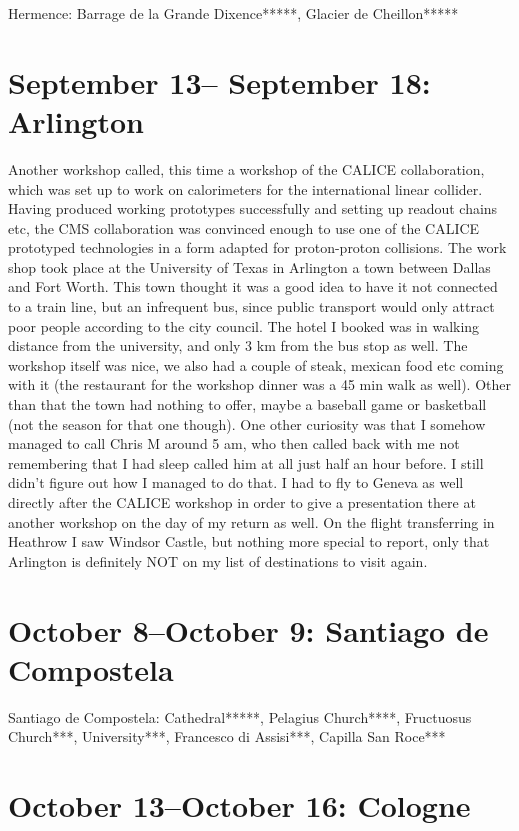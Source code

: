 Hermence: Barrage de la Grande Dixence*****, Glacier de Cheillon*****

\section{September 13-- September 18: Arlington}
\label{Arlington2016}

Another workshop called, this time a workshop of the CALICE collaboration, which was set up to work on calorimeters for the international linear collider. Having produced working prototypes successfully and setting up readout chains etc, the CMS collaboration was convinced enough to use one of the CALICE prototyped technologies in a form adapted for proton-proton collisions. The work shop took place at the University of Texas in Arlington a town between Dallas and Fort Worth. This town thought it was a good idea to have it not connected to a train line, but an infrequent bus, since public transport would only attract poor people according to the city council. The hotel I booked was in walking distance from the university, and only 3 km from the bus stop as well. The workshop itself was nice, we also had a couple of steak, mexican food etc coming with it (the restaurant for the workshop dinner was a 45 min walk as well). Other than that the town had nothing to offer, maybe a baseball game or basketball (not the season for that one though). One other curiosity was that I somehow managed to call Chris M around 5 am, who then called back with me not remembering that I had sleep called him at all just half an hour before. I still didn't figure out how I managed to do that. I had to fly to Geneva as well directly after the CALICE workshop in order to give a presentation there at another workshop on the day of my return as well. On the flight transferring in Heathrow I saw Windsor Castle, but nothing more special to report, only that Arlington is definitely NOT on my list of destinations to visit again.

\section{October 8--October 9: Santiago de Compostela}
\label{Santiago2016}

Santiago de Compostela: Cathedral*****, Pelagius Church****, Fructuosus Church***, University***, Francesco di Assisi***, Capilla San Roce***

\section{October 13--October 16: Cologne}
\label{Cologne2016}

